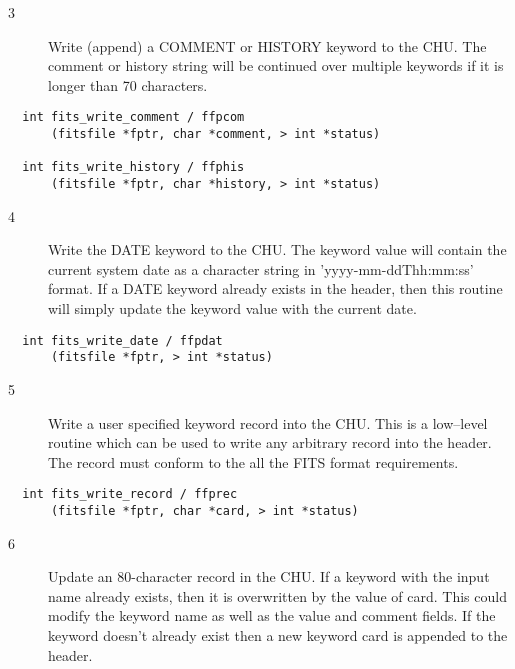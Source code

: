 \documentclass[11pt]{book}
\begin{document}
\begin{description}
\item[3 ] Write (append) a COMMENT or HISTORY keyword to the CHU.  The comment or
    history string will be continued over multiple keywords if it is longer
   than 70 characters. \label{ffpcom} \label{ffphis}
\end{description}

\begin{verbatim}
  int fits_write_comment / ffpcom
      (fitsfile *fptr, char *comment, > int *status)

  int fits_write_history / ffphis
      (fitsfile *fptr, char *history, > int *status)
\end{verbatim}

\begin{description}
\item[4 ] Write the DATE keyword to the CHU. The keyword value will contain
    the current system date as a character string in 'yyyy-mm-ddThh:mm:ss'
    format. If a DATE keyword already exists in the header, then this
    routine will simply update the keyword value with the current date.
   \label{ffpdat}
\end{description}

\begin{verbatim}
  int fits_write_date / ffpdat
      (fitsfile *fptr, > int *status)
\end{verbatim}

\begin{description}
\item[5 ]Write a user specified keyword record into the CHU.  This is
   a low--level routine which can be used to write any arbitrary
   record into the header.  The record must conform to the all
  the FITS format requirements. \label{ffprec}
\end{description}

\begin{verbatim}
  int fits_write_record / ffprec
      (fitsfile *fptr, char *card, > int *status)
\end{verbatim}

\begin{description}
\item[6 ]Update an 80-character record in the CHU.  If a keyword with the input
   name already exists, then it is overwritten by the value of card.  This
   could modify the keyword name as well as the value and comment fields.
   If the keyword doesn't already exist then a new keyword card is appended
  to the header. \label{ffucrd}
\end{description}
\end{document}
